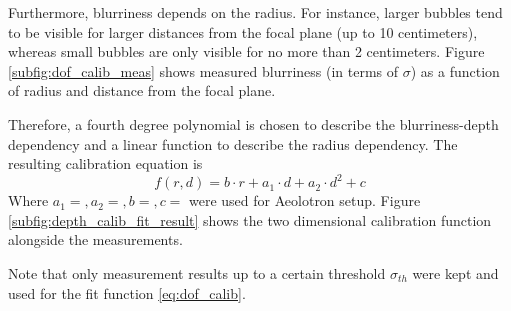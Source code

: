 			Furthermore, blurriness depends on the radius. For instance, larger bubbles tend to be visible for larger distances from the focal plane (up to 10 centimeters), whereas small bubbles are only visible for no more than 2 centimeters. Figure \ref{subfig:dof_calib_meas} shows measured blurriness (in terms of $\sigma$) as a function of radius and distance from the focal plane. 
			
			Therefore, a fourth degree polynomial is chosen to describe the blurriness-depth dependency and a linear function to describe the radius dependency. The resulting calibration equation is 
			\begin{equation}
				f(r, d) = b \cdot r + a_1 \cdot d + a_2 \cdot d^2 + c
				\label{eq:dof_calib}				
			\end{equation}
			Where $a_1 =, a_2=, b=, c= $ were used for Aeolotron setup. Figure \ref{subfig:depth_calib_fit_result} shows the two dimensional calibration function alongside the measurements. 
			
			Note that only measurement results up to a certain threshold $\sigma_{th}$ were kept and used for the fit function \ref{eq:dof_calib}. 
			
			
			
